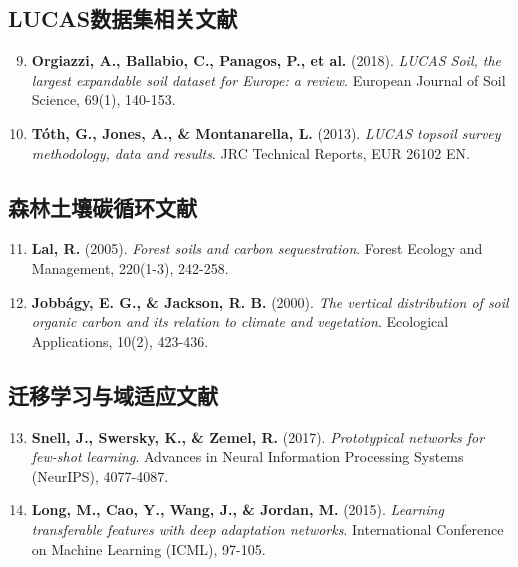 \documentclass[12pt, a4paper]{article}
\begin{document}
\subsection{LUCAS数据集相关文献}
\begin{enumerate}
    \setcounter{enumi}{8}
    \item \textbf{Orgiazzi, A., Ballabio, C., Panagos, P., et al.} (2018). \textit{LUCAS Soil, the largest expandable soil dataset for Europe: a review}. European Journal of Soil Science, 69(1), 140-153.
    
    \item \textbf{Tóth, G., Jones, A., \& Montanarella, L.} (2013). \textit{LUCAS topsoil survey methodology, data and results}. JRC Technical Reports, EUR 26102 EN.
\end{enumerate}

\subsection{森林土壤碳循环文献}
\begin{enumerate}
    \setcounter{enumi}{10}
    \item \textbf{Lal, R.} (2005). \textit{Forest soils and carbon sequestration}. Forest Ecology and Management, 220(1-3), 242-258.
    
    \item \textbf{Jobbágy, E. G., \& Jackson, R. B.} (2000). \textit{The vertical distribution of soil organic carbon and its relation to climate and vegetation}. Ecological Applications, 10(2), 423-436.
\end{enumerate}

\subsection{迁移学习与域适应文献}
\begin{enumerate}
    \setcounter{enumi}{12}
    \item \textbf{Snell, J., Swersky, K., \& Zemel, R.} (2017). \textit{Prototypical networks for few-shot learning}. Advances in Neural Information Processing Systems (NeurIPS), 4077-4087.
    
    \item \textbf{Long, M., Cao, Y., Wang, J., \& Jordan, M.} (2015). \textit{Learning transferable features with deep adaptation networks}. International Conference on Machine Learning (ICML), 97-105.
\end{enumerate}
\end{document}
